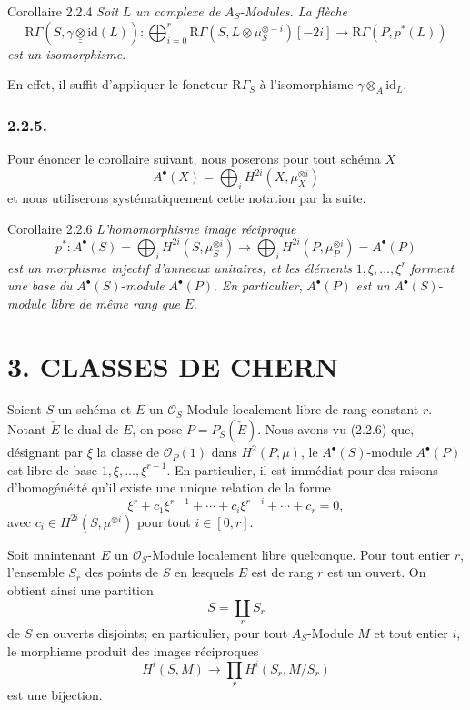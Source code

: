 \begin{statement}{Corollaire 2.2.4}
\emph{Soit} $L$ \emph{un complexe de} $A_S$-\emph{Modules. La flèche}
\[
\mathrm{R}\Gamma(S,\gamma\mathbin{\underline{\underline{\otimes}}}\mathrm{id}(L)):
\bigoplus_{i=0}^r \mathrm{R}\Gamma(S,L\otimes\mu_S^{\otimes -i})[-2i]
\longrightarrow
\mathrm{R}\Gamma(P,p^*(L))
\]
\emph{est un isomorphisme}.
\end{statement}

En effet, il suffit d'appliquer le foncteur $\mathrm{R}\Gamma_S$ à l'isomorphisme $\gamma\otimes_A\mathrm{id}_L$.

\subsubsection*{2.2.5.}
Pour énoncer le corollaire suivant, nous poserons pour tout schéma $X$
\[
A^\bullet(X)=\bigoplus_i H^{2i}(X,\mu_X^{\otimes i})
\]
et nous utiliserons systématiquement cette notation par la suite.

\begin{statement}{Corollaire 2.2.6}
\emph{L'homomorphisme image réciproque}
\[
p^*:A^\bullet(S)=\bigoplus_i H^{2i}(S,\mu_S^{\otimes i})
\longrightarrow
\bigoplus_i H^{2i}(P,\mu_P^{\otimes i})=A^\bullet(P)
\]
\emph{est un morphisme injectif d'anneaux unitaires, et les éléments} $1,\xi,\ldots,\xi^r$ \emph{forment une base du} $A^\bullet(S)$-\emph{module} $A^\bullet(P)$. \emph{En particulier}, $A^\bullet(P)$ \emph{est un} $A^\bullet(S)$-\emph{module libre de même rang que} $E$.
\end{statement}

\section*{3. CLASSES DE CHERN}

Soient $S$ un schéma et $E$ un $\mathcal{O}_S$-Module localement libre de rang constant $r$. Notant $\check E$ le dual de $E$, on pose $P=P_S(\check E)$. Nous avons vu (2.2.6) que, désignant par $\xi$ la classe de $\mathcal{O}_P(1)$ dans $H^2(P,\mu)$, le $A^\bullet(S)$-module $A^\bullet(P)$ est libre de base $1,\xi,\ldots,\xi^{r-1}$. En particulier, il est immédiat pour des raisons d'homogénéité qu'il existe une unique relation de la forme
\[
\xi^r+c_1\xi^{r-1}+\cdots+c_i\xi^{r-i}+\cdots+c_r=0,
\tag*{3.1.}
\]
avec $c_i\in H^{2i}(S,\mu^{\otimes i})$ pour tout $i\in[0,r]$.

Soit maintenant $E$ un $\mathcal{O}_S$-Module localement libre quelconque. Pour tout entier $r$, l'ensemble $S_r$ des points de $S$ en lesquels $E$ est de rang $r$ est un ouvert. On obtient ainsi une partition
\[
S=\coprod_r S_r
\]
de $S$ en ouverts disjoints; en particulier, pour tout $A_S$-Module $M$ et tout entier $i$, le morphisme produit des images réciproques
\[
H^i(S,M)\longrightarrow \prod_r H^i(S_r,M/S_r)
\]
est une bijection.

